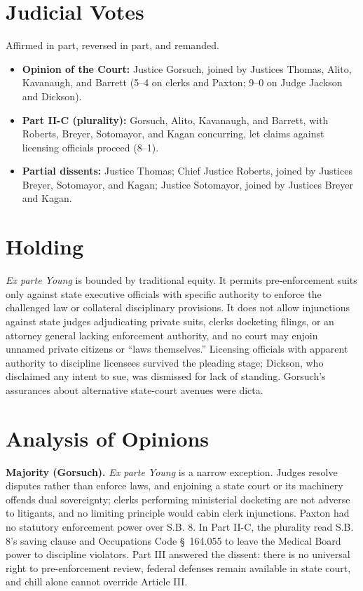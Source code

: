 \documentclass[12pt]{article}
\begin{document}
\section{Judicial Votes}

Affirmed in part, reversed in part, and remanded.
\begin{itemize}
\item \textbf{Opinion of the Court:} Justice Gorsuch, joined by Justices Thomas, Alito, Kavanaugh, and Barrett (5--4 on clerks and Paxton; 9--0 on Judge Jackson and Dickson).
\item \textbf{Part II-C (plurality):} Gorsuch, Alito, Kavanaugh, and Barrett, with Roberts, Breyer, Sotomayor, and Kagan concurring, let claims against licensing officials proceed (8--1).
\item \textbf{Partial dissents:} Justice Thomas; Chief Justice Roberts, joined by Justices Breyer, Sotomayor, and Kagan; Justice Sotomayor, joined by Justices Breyer and Kagan.
\end{itemize}

\section{Holding}

\textit{Ex parte Young} is bounded by traditional equity. It permits pre-enforcement suits only against state executive officials with specific authority to enforce the challenged law or collateral disciplinary provisions. It does not allow injunctions against state judges adjudicating private suits, clerks docketing filings, or an attorney general lacking enforcement authority, and no court may enjoin unnamed private citizens or ``laws themselves.'' Licensing officials with apparent authority to discipline licensees survived the pleading stage; Dickson, who disclaimed any intent to sue, was dismissed for lack of standing. Gorsuch's assurances about alternative state-court avenues were dicta.

\section{Analysis of Opinions}

\textbf{Majority (Gorsuch).} \textit{Ex parte Young} is a narrow exception. Judges resolve disputes rather than enforce laws, and enjoining a state court or its machinery offends dual sovereignty; clerks performing ministerial docketing are not adverse to litigants, and no limiting principle would cabin clerk injunctions. Paxton had no statutory enforcement power over S.B. 8. In Part II-C, the plurality read S.B. 8's saving clause and Occupations Code \S~164.055 to leave the Medical Board power to discipline violators. Part III answered the dissent: there is no universal right to pre-enforcement review, federal defenses remain available in state court, and chill alone cannot override Article III.
\end{document}

